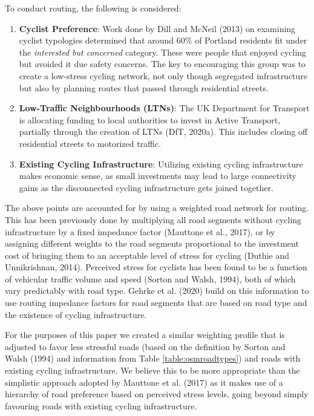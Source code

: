 \documentclass[
]{article}
\providecommand{\tightlist}{%
  \setlength{\itemsep}{0pt}\setlength{\parskip}{0pt}}
\begin{document}
To conduct routing, the following is considered:

\begin{enumerate}
\def\labelenumi{\arabic{enumi}.}
\tightlist
\item
  \textbf{Cyclist Preference}: Work done by Dill and McNeil (2013) on examining
  cyclist typologies determined that around 60\% of Portland residents
  fit under the \emph{interested but concerned} category. These were people
  that enjoyed cycling but avoided it due safety concerns. The key to
  encouraging this group was to create a low-stress cycling network,
  not only though segregated infrastructure but also by planning
  routes that passed through residential streets.
\item
  \textbf{Low-Traffic Neighbourhoods (LTNs)}: The UK Department for Transport is
  allocating funding to local authorities to invest in Active
  Transport, partially through the creation of LTNs
  (DfT, 2020a). This includes closing off residential
  streets to motorized traffic.
\item
  \textbf{Existing Cycling Infrastructure}: Utilizing existing cycling
  infrastructure makes economic sense, as small investments may lead
  to large connectivity gains as the disconnected cycling
  infrastructure gets joined together.
\end{enumerate}

The above points are accounted for by using a weighted road network for
routing. This has been previously done by multiplying all road segments
without cycling infrastructure by a fixed impedance factor
(Mauttone et al., 2017), or by assigning different weights to the road
segments proportional to the investment cost of bringing them to an
acceptable level of stress for cycling (Duthie and Unnikrishnan, 2014).
Perceived stress for cyclists has been found to be a function of vehicular traffic
volume and speed (Sorton and Walsh, 1994), both of which vary predictably
with road type. Gehrke et al. (2020) build on this information to use
routing impedance factors for road segments that are based on road type
and the existence of cycling infrastructure.

For the purposes of this paper we created a similar weighting profile
that is adjusted to favor less stressful roads (based on the definition
by Sorton and Walsh (1994) and information from Table
\ref{table:osmroadtypes}) and roads with existing cycling
infrastructure. We believe this to be more appropriate than the simplistic
approach adopted by Mauttone et al. (2017) as it makes use of a hierarchy
of road preference based on perceived stress levels, going beyond simply
favouring roads with existing cycling infrastructure.
\end{document}
